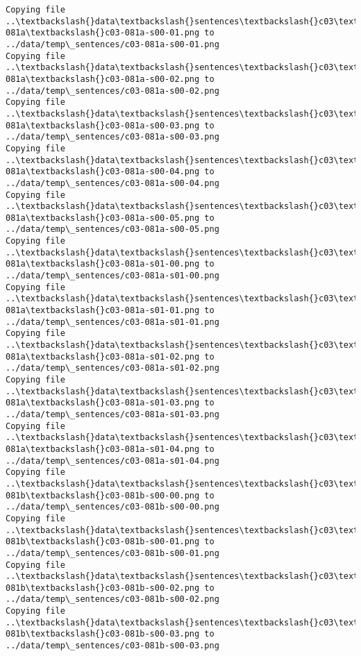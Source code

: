 \documentclass[11pt]{article}
\begin{document}
\begin{Verbatim}[commandchars=\\\{\}]
Copying file ..\textbackslash{}data\textbackslash{}sentences\textbackslash{}c03\textbackslash{}c03-081a\textbackslash{}c03-081a-s00-01.png to
../data/temp\_sentences/c03-081a-s00-01.png
Copying file ..\textbackslash{}data\textbackslash{}sentences\textbackslash{}c03\textbackslash{}c03-081a\textbackslash{}c03-081a-s00-02.png to
../data/temp\_sentences/c03-081a-s00-02.png
Copying file ..\textbackslash{}data\textbackslash{}sentences\textbackslash{}c03\textbackslash{}c03-081a\textbackslash{}c03-081a-s00-03.png to
../data/temp\_sentences/c03-081a-s00-03.png
Copying file ..\textbackslash{}data\textbackslash{}sentences\textbackslash{}c03\textbackslash{}c03-081a\textbackslash{}c03-081a-s00-04.png to
../data/temp\_sentences/c03-081a-s00-04.png
Copying file ..\textbackslash{}data\textbackslash{}sentences\textbackslash{}c03\textbackslash{}c03-081a\textbackslash{}c03-081a-s00-05.png to
../data/temp\_sentences/c03-081a-s00-05.png
Copying file ..\textbackslash{}data\textbackslash{}sentences\textbackslash{}c03\textbackslash{}c03-081a\textbackslash{}c03-081a-s01-00.png to
../data/temp\_sentences/c03-081a-s01-00.png
Copying file ..\textbackslash{}data\textbackslash{}sentences\textbackslash{}c03\textbackslash{}c03-081a\textbackslash{}c03-081a-s01-01.png to
../data/temp\_sentences/c03-081a-s01-01.png
Copying file ..\textbackslash{}data\textbackslash{}sentences\textbackslash{}c03\textbackslash{}c03-081a\textbackslash{}c03-081a-s01-02.png to
../data/temp\_sentences/c03-081a-s01-02.png
Copying file ..\textbackslash{}data\textbackslash{}sentences\textbackslash{}c03\textbackslash{}c03-081a\textbackslash{}c03-081a-s01-03.png to
../data/temp\_sentences/c03-081a-s01-03.png
Copying file ..\textbackslash{}data\textbackslash{}sentences\textbackslash{}c03\textbackslash{}c03-081a\textbackslash{}c03-081a-s01-04.png to
../data/temp\_sentences/c03-081a-s01-04.png
Copying file ..\textbackslash{}data\textbackslash{}sentences\textbackslash{}c03\textbackslash{}c03-081b\textbackslash{}c03-081b-s00-00.png to
../data/temp\_sentences/c03-081b-s00-00.png
Copying file ..\textbackslash{}data\textbackslash{}sentences\textbackslash{}c03\textbackslash{}c03-081b\textbackslash{}c03-081b-s00-01.png to
../data/temp\_sentences/c03-081b-s00-01.png
Copying file ..\textbackslash{}data\textbackslash{}sentences\textbackslash{}c03\textbackslash{}c03-081b\textbackslash{}c03-081b-s00-02.png to
../data/temp\_sentences/c03-081b-s00-02.png
Copying file ..\textbackslash{}data\textbackslash{}sentences\textbackslash{}c03\textbackslash{}c03-081b\textbackslash{}c03-081b-s00-03.png to
../data/temp\_sentences/c03-081b-s00-03.png

\end{Verbatim}
\end{document}
